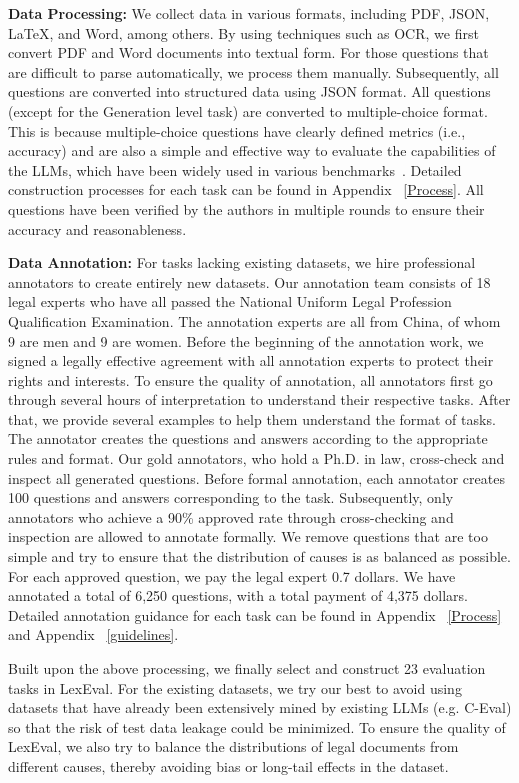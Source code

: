 \textbf{Data Processing:} We collect data in various formats, including PDF, JSON, LaTeX, and Word, among others. By using techniques such as OCR, we first convert PDF and Word documents into textual form. For those questions that are difficult to parse automatically, we process them manually.
Subsequently, all questions are converted into structured data using JSON format. 
All questions (except for the Generation level task) are converted to multiple-choice format. This is because multiple-choice questions have clearly defined metrics (i.e., accuracy) and are also a simple and effective way to evaluate the capabilities of the LLMs, which have been widely used in various benchmarks~\cite{fei2023lawbench,dai2023laiw,huang2023c}. Detailed construction processes for each task can be found in Appendix ~\ref{Process}.
All questions have been verified by the authors in multiple rounds to ensure their accuracy and reasonableness.

\textbf{Data Annotation:}
For tasks lacking existing datasets, we hire professional annotators to create entirely new datasets.
Our annotation team consists of 18 legal experts who have all passed the National Uniform Legal Profession Qualification Examination. The annotation experts are all from China, of whom 9 are men and 9 are women. Before the beginning of the annotation work, we signed a legally effective agreement with all annotation experts to protect their rights and interests. To ensure the quality of annotation, all annotators first go through several hours of interpretation to understand their respective tasks. After that, we provide several examples to help them understand the format of tasks. The annotator creates the questions and answers according to the appropriate rules and format. Our gold annotators, who hold a Ph.D. in law, cross-check and inspect all generated questions. 
Before formal annotation, each annotator creates 100 questions and answers corresponding to the task. Subsequently, only annotators who achieve a 90\% approved rate through cross-checking and inspection are allowed to annotate formally.
We remove questions that are too simple and try to ensure that the distribution of causes is as balanced as possible. For each approved question, we pay the legal expert 0.7 dollars. We have annotated a total of 6,250 questions, with a total payment of 4,375 dollars. Detailed annotation guidance for each task can be found in Appendix ~\ref{Process} and Appendix ~\ref{guidelines}.
 
Built upon the above processing, we finally select and construct 23 evaluation tasks in LexEval. For the existing datasets, we try our best to avoid using datasets that have already been extensively mined by existing LLMs (e.g. C-Eval) so that the risk of test data leakage could be minimized. To ensure the quality of LexEval, we also try to balance the distributions of legal documents from different causes, thereby avoiding bias or long-tail effects in the dataset. 

